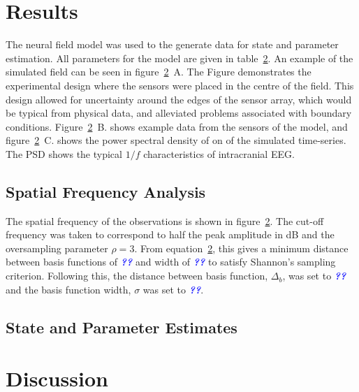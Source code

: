 \documentclass[12pt]{iopart}		%
\newcommand{\todo}[1]{\textsf{\emph{\textbf{\textcolor{blue}{#1}}}}}
\begin{document}
\section{Results}
The neural field model was used to the generate data for state and parameter estimation. All parameters for the model are given in table~\ref{}. An example of the simulated field can be seen in figure~\ref{}~A. The Figure demonstrates the experimental design where the sensors were placed in the centre of the field. This design allowed for uncertainty around the edges of the sensor array, which would be typical from physical data, and alleviated problems associated with boundary conditions. Figure~\ref{}~B. shows example data from the sensors of the model, and figure~\ref{}~C. shows the power spectral density of on of the simulated time-series. The PSD shows the typical $1/f$ characteristics of intracranial EEG.

\subsection{Spatial Frequency Analysis}
The spatial frequency of the observations is shown in figure~\ref{}. The cut-off frequency was taken to correspond to half the peak amplitude in dB and the oversampling parameter $\rho=3$. From equation~\ref{}, this gives a minimum distance between basis functions of \todo{??} and width of \todo{??} to satisfy Shannon's sampling criterion. Following this, the distance between basis function, $\Delta_b$, was set to \todo{??} and the basis function width, $\sigma$ was set to \todo{??}.
    
\subsection{State and Parameter Estimates}


\section{Discussion}
\end{document}
